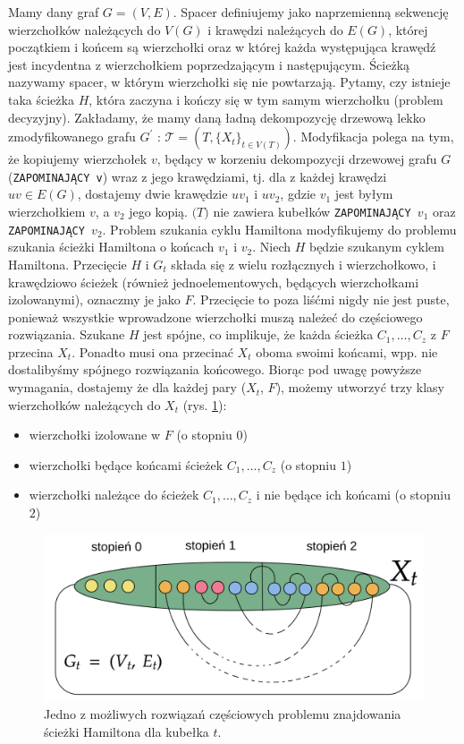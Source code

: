 \documentclass[12pt, oneside]{report}
\begin{document}
Mamy dany graf $G=(V, E)$. Spacer definiujemy jako naprzemienną sekwencję wierzchołków należących do $V(G)$ i krawędzi należących do $E(G)$, której początkiem i końcem są wierzchołki oraz w której każda występująca krawędź jest incydentna z wierzchołkiem poprzedzającym i następującym. Ścieżką nazywamy spacer, w którym wierzchołki się nie powtarzają. Pytamy, czy istnieje taka ścieżka $H$, która zaczyna i kończy się w tym samym wierzchołku (problem decyzyjny). Zakładamy, że mamy daną ładną dekompozycję drzewową lekko zmodyfikowanego grafu $G^{\prime}$ : $\mathcal{T} = (T, \{X_t\}_{t \in V(T)})$. Modyfikacja polega na tym, że kopiujemy wierzchołek $v$, będący w korzeniu dekompozycji drzewowej grafu $G$ (\texttt{ZAPOMINAJĄCY v}) wraz z jego krawędziami, tj. dla z każdej krawędzi $uv \in E(G)$, dostajemy dwie krawędzie $uv_1$ i $uv_2$, gdzie $v_1$ jest byłym wierzchołkiem $v$, a $v_2$ jego kopią. $\mathcal(T)$ nie zawiera kubełków \texttt{ZAPOMINAJĄCY $v_1$} oraz \texttt{ZAPOMINAJĄCY $v_2$}. Problem szukania cyklu Hamiltona modyfikujemy do problemu szukania ścieżki Hamiltona o końcach $v_1$ i $v_2$.
\newline\newline
Niech $H$ będzie szukanym cyklem Hamiltona. Przecięcie $H$ i $G_t$ składa się z wielu rozłącznych i wierzchołkowo, i krawędziowo ścieżek (również jednoelementowych, będących wierzchołkami izolowanymi), oznaczmy je jako $F$. Przecięcie to poza liśćmi nigdy nie jest puste, ponieważ wszystkie wprowadzone wierzchołki muszą należeć do częściowego rozwiązania. Szukane $H$ jest spójne, co implikuje, że każda ścieżka $C_1, \ldots, C_z$ z $F$ przecina $X_t$. Ponadto musi ona przecinać $X_t$ oboma swoimi końcami, wpp. nie dostalibyśmy spójnego rozwiązania końcowego. Biorąc pod uwagę powyższe wymagania, dostajemy że dla każdej pary ($X_t$, $F$), możemy utworzyć trzy klasy wierzchołków należących do $X_t$ (rys. \ref{hamiltonian}):
\begin{itemize}
\item wierzchołki izolowane w $F$ (o stopniu $0$)
\item wierzchołki będące końcami ścieżek $C_1, \ldots, C_z$ (o stopniu $1$)
\item wierzchołki należące do ścieżek $C_1, \ldots, C_z$ i nie będące ich końcami (o stopniu $2$)
\end{itemize}

\begin{figure}
\centering
\label{hamiltonian}
\includegraphics[width=16cm]{hamiltonian3.png}
\caption{Jedno z możliwych rozwiązań częściowych problemu znajdowania ścieżki Hamiltona dla kubełka $t$.}
\end{figure}
\end{document}
